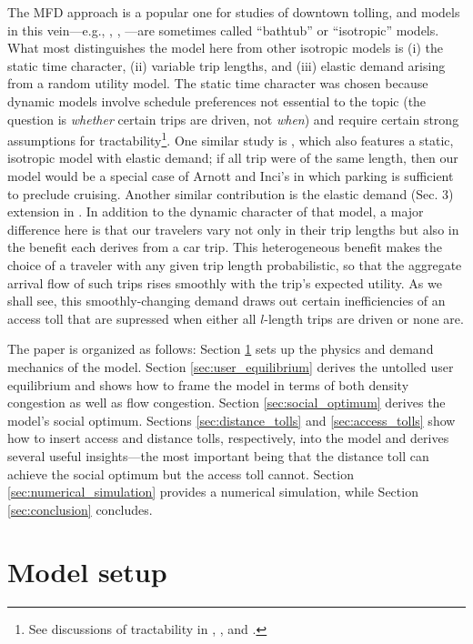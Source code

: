 \documentclass[preprint,authoryear]{elsarticle}
\begin{document}
The MFD approach is a popular one for studies of downtown tolling, and models in this vein---e.g., \citet{SmallChu2003}, \citet{Arnott2013}, \citet{Geroliminis2009a}---are sometimes called ``bathtub'' or ``isotropic'' models. What most distinguishes the model here from other isotropic models is (i) the static time character, (ii) variable trip lengths, and (iii) elastic demand arising from a random utility model. The static time character was chosen because dynamic models involve schedule preferences not essential to the topic (the question is \emph{whether} certain trips are driven, not \emph{when}) and require certain strong assumptions for tractability\footnote{See discussions of tractability in \citet{Fosgerau2015}, \citet{Daganzo2015}, \citet{Arnott2016} and \citet{Mariotte2017}.}. One similar study is \citet{Arnott2010}, which also features a static, isotropic model with elastic demand; if all trip were of the same length, then our model would be a special case of Arnott and Inci's in which parking is sufficient to preclude cruising. Another similar contribution is the elastic demand (Sec. 3) extension in \citet{Fosgerau2015}. In addition to the dynamic character of that model, a major difference here is that our travelers vary not only in their trip lengths but also in the benefit each derives from a car trip. This heterogeneous benefit makes the choice of a traveler with any given trip length probabilistic, so that the aggregate arrival flow of such trips rises smoothly with the trip's expected utility. As we shall see, this smoothly-changing demand draws out certain inefficiencies of an access toll that are supressed when either all $l$-length trips are driven or none are.

The paper is organized as follows: Section \ref{sec:model_setup} sets up the physics and demand mechanics of the model. Section \ref{sec:user_equilibrium} derives the untolled user equilibrium and shows how to frame the model in terms of both density congestion as well as flow congestion. Section \ref{sec:social_optimum} derives the model's social optimum. Sections \ref{sec:distance_tolls} and \ref{sec:access_tolls} show how to insert access and distance tolls, respectively, into the model and derives several useful insights---the most important being that the distance toll can achieve the social optimum but the access toll cannot. Section \ref{sec:numerical_simulation} provides a numerical simulation, while Section \ref{sec:conclusion} concludes.

\section{Model setup}
\label{sec:model_setup}
\end{document}
